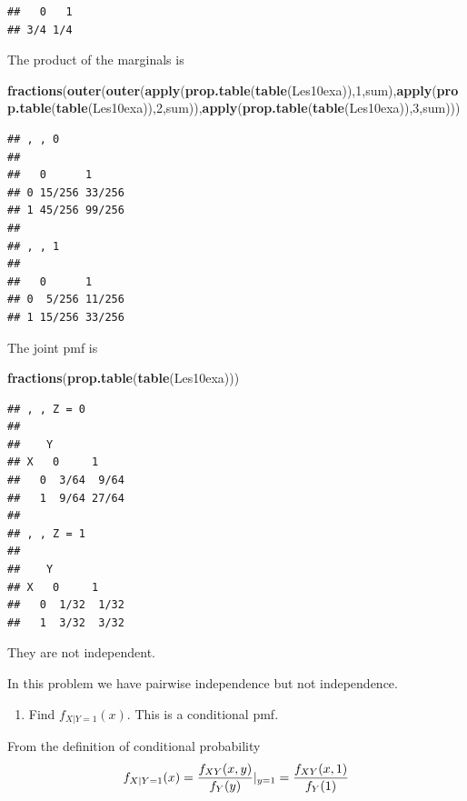 \documentclass[]{book}
\newenvironment{Shaded}{\begin{snugshade}}{\end{snugshade}}
\newcommand{\KeywordTok}[1]{\textcolor[rgb]{0.13,0.29,0.53}{\textbf{#1}}}
\newcommand{\DecValTok}[1]{\textcolor[rgb]{0.00,0.00,0.81}{#1}}
\newcommand{\NormalTok}[1]{#1}
\providecommand{\tightlist}{%
  \setlength{\itemsep}{0pt}\setlength{\parskip}{0pt}}
\theoremstyle{definition}
\theoremstyle{definition}
\theoremstyle{definition}
\theoremstyle{remark}
\begin{document}
\begin{verbatim}
##   0   1 
## 3/4 1/4
\end{verbatim}

The product of the marginals is

\begin{Shaded}
\begin{Highlighting}[]
\KeywordTok{fractions}\NormalTok{(}\KeywordTok{outer}\NormalTok{(}\KeywordTok{outer}\NormalTok{(}\KeywordTok{apply}\NormalTok{(}\KeywordTok{prop.table}\NormalTok{(}\KeywordTok{table}\NormalTok{(Les10exa)),}\DecValTok{1}\NormalTok{,sum),}\KeywordTok{apply}\NormalTok{(}\KeywordTok{prop.table}\NormalTok{(}\KeywordTok{table}\NormalTok{(Les10exa)),}\DecValTok{2}\NormalTok{,sum)),}\KeywordTok{apply}\NormalTok{(}\KeywordTok{prop.table}\NormalTok{(}\KeywordTok{table}\NormalTok{(Les10exa)),}\DecValTok{3}\NormalTok{,sum)))}
\end{Highlighting}
\end{Shaded}

\begin{verbatim}
## , , 0
## 
##   0      1     
## 0 15/256 33/256
## 1 45/256 99/256
## 
## , , 1
## 
##   0      1     
## 0  5/256 11/256
## 1 15/256 33/256
\end{verbatim}

The joint pmf is

\begin{Shaded}
\begin{Highlighting}[]
\KeywordTok{fractions}\NormalTok{(}\KeywordTok{prop.table}\NormalTok{(}\KeywordTok{table}\NormalTok{(Les10exa)))}
\end{Highlighting}
\end{Shaded}

\begin{verbatim}
## , , Z = 0
## 
##    Y
## X   0     1    
##   0  3/64  9/64
##   1  9/64 27/64
## 
## , , Z = 1
## 
##    Y
## X   0     1    
##   0  1/32  1/32
##   1  3/32  3/32
\end{verbatim}

They are not independent.

In this problem we have pairwise independence but not independence.

\begin{enumerate}
\def\labelenumi{\arabic{enumi}.}
\setcounter{enumi}{6}
\tightlist
\item
  Find \(f_{X|Y=1}(x)\). This is a conditional pmf.
\end{enumerate}

From the definition of conditional probability
\[f_{X|Y=1}(x)={f_{XY}(x,y) \over f_{Y}(y)}|_{y=1}={f_{XY}(x,1) \over f_{Y}(1)}\]
\end{document}
